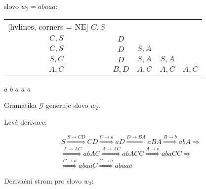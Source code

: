 \begin{minipage}{0.5\textwidth}
    slovo $w_2 = abaaa$: 
    
    \begin{NiceTabular}{ccccc}[hvlines, corners = NE] %
        $C,S$ &   &   &   &   \\ 
        $C, S$ & $D$ &   &   &   \\ 
        $C,S$ & $D$ & $S,A$ &   &   \\ 
        $S,C$ & $D$ & $S,A$ & $S,A$ &   \\ 
        $A,C$ & $B, D$ & $A,C$ & $A,C$ & $A,C$ \\ 
    \end{NiceTabular}
    
\hspace*{5mm}$a$ \hspace*{8mm} $b$ \hspace*{8mm} $a$ \hspace*{8mm} $a$ \hspace*{8mm} $a$


        \vspace*{2mm}
        Gramatika $\mathcal{G}$ generuje slovo $w_2$. 
        
        \vspace*{3mm}

        Levá derivace: 

            \begin{align*}
                        & S\stackrel{S \rightarrow CD}{\Longrightarrow} CD 
                        \stackrel{C \rightarrow a}{\Longrightarrow} aD 
                        \stackrel{D \rightarrow BA}{\Longrightarrow} aBA  
                        \stackrel{B \rightarrow b}{\Longrightarrow} abA \Longrightarrow\\
                        &\stackrel{A \rightarrow AC}{\Longrightarrow} abAC 
                    \stackrel{A \rightarrow AC}{\Longrightarrow} abACC 
                    \stackrel{A \rightarrow a}{\Longrightarrow} abaCC \Longrightarrow\\
                  &\stackrel{C \rightarrow a}{\Longrightarrow} abaaC 
                    \stackrel{C \rightarrow a}{\Longrightarrow} abaaa
            \end{align*}
        
\end{minipage}\begin{minipage}{0.5\textwidth}
    

    Derivační strom pro slovo $w_2$:
    \vspace*{5mm}
    \begin{center}
        

\end{center}
\end{minipage}
